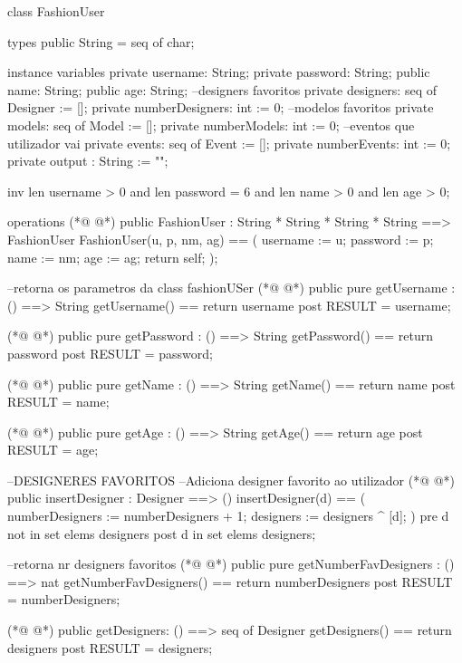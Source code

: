\begin{vdmpp}[breaklines=true]
class FashionUser

types
 public String = seq of char;
 
instance variables
 private username: String;
 private password: String;
 public name: String;
 public age: String;
 --designers favoritos
 private  designers: seq of Designer := [];
 private  numberDesigners: int := 0;
  --modelos favoritos
 private  models: seq of Model := [];
 private  numberModels: int := 0;
 --eventos que utilizador vai
 private events: seq of Event := [];
 private  numberEvents: int := 0;
 private output : String := "";
 
 inv len username > 0 and len password = 6 and len name > 0 and len age > 0;


operations  
(*@
\label{FashionUser:26}
@*)
  public FashionUser : String *
            String *
            String *
            String  ==> FashionUser
  FashionUser(u, p, nm, ag) ==
  (
   username := u;
   password := p;
    name := nm;
    age := ag;
    return self;
  );
  
  --retorna os parametros da class fashionUSer
(*@
\label{getUsername:40}
@*)
  public pure getUsername : () ==> String
    getUsername() == return username
    post RESULT = username;
    
(*@
\label{getPassword:44}
@*)
  public pure getPassword : () ==> String
    getPassword() == return password
    post RESULT = password;
  
(*@
\label{getName:48}
@*)
  public pure getName : () ==> String
    getName() == return name
    post RESULT = name;
    
(*@
\label{getAge:52}
@*)
  public pure getAge : () ==> String
  getAge() == return age
  post RESULT = age;   
  
   
    --DESIGNERES FAVORITOS  
   --Adiciona designer favorito ao utilizador
(*@
\label{insertDesigner:59}
@*)
  public insertDesigner : Designer ==> ()
   insertDesigner(d) ==
   (
     numberDesigners := numberDesigners + 1;
     designers := designers ^ [d];
   )
   pre d not in set elems designers
   post d in set elems designers;
   
  --retorna nr designers favoritos
(*@
\label{getNumberFavDesigners:69}
@*)
   public pure getNumberFavDesigners : () ==> nat
   getNumberFavDesigners() == return numberDesigners
   post RESULT = numberDesigners;
    
(*@
\label{getDesigners:73}
@*)
   public getDesigners: () ==> seq of Designer
   getDesigners() == return designers
   post RESULT = designers;
   

\end{vdmpp}
